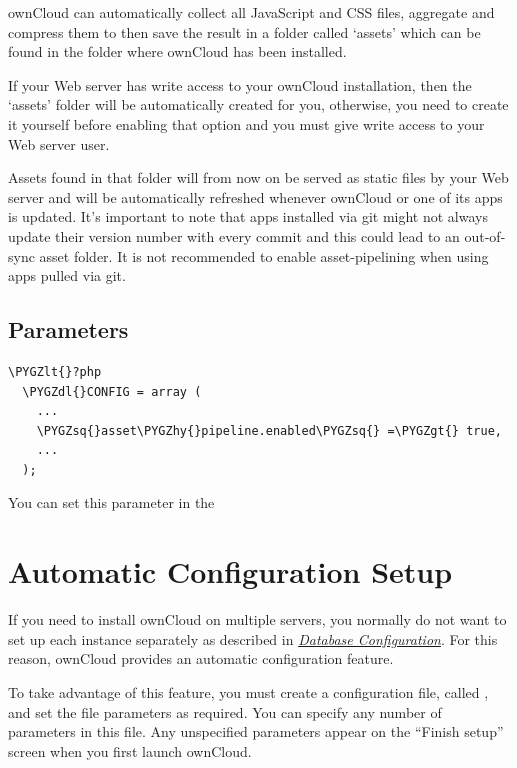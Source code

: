 \documentclass[letterpaper,10pt,english]{sphinxmanual}
\def\PYGZlt{\char`\<}
\def\PYGZgt{\char`\>}
\def\PYGZdl{\char`\$}
\def\PYGZhy{\char`\-}
\def\PYGZsq{\char`\'}
\renewcommand\PYGZsq{\textquotesingle}
\begin{document}
ownCloud can automatically collect all JavaScript and CSS files, aggregate and compress them to then save the result in a folder called `assets' which can be found in the folder where ownCloud has been installed.

If your Web server has write access to your ownCloud installation, then the `assets' folder will be automatically created for you, otherwise, you need to create it yourself before enabling that option and you must give write access to your Web server user.

Assets found in that folder will from now on be served as static files by your Web server and will be automatically refreshed whenever ownCloud or one of its apps is updated.
It's important to note that apps installed via git might not always update their version number with every commit and this could lead to an out-of-sync asset folder.
It is not recommended to enable asset-pipelining when using apps pulled via git.


\subsection{Parameters}
\label{configuration_server/js_css_asset_management_configuration:parameters}
\begin{Verbatim}[commandchars=\\\{\}]
\PYGZlt{}?php
  \PYGZdl{}CONFIG = array (
    ...
    \PYGZsq{}asset\PYGZhy{}pipeline.enabled\PYGZsq{} =\PYGZgt{} true,
    ...
  );
\end{Verbatim}

You can set this parameter in the 


\section{Automatic Configuration Setup}
\label{configuration_server/automatic_configuration:automatic-configuration-setup}\label{configuration_server/automatic_configuration::doc}
If you need to install ownCloud on multiple servers, you normally do not want
to set up each instance separately as described in
{\hyperref[configuration_database/linux_database_configuration::doc]{\emph{\emph{Database Configuration}}}}.
For this reason, ownCloud provides an automatic configuration feature.

To take advantage of this feature, you must create a configuration file, called
, and set the file parameters as required.
You can specify any number of parameters in this file.  Any unspecified parameters appear on the ``Finish setup'' screen when you first launch ownCloud.
\end{document}

